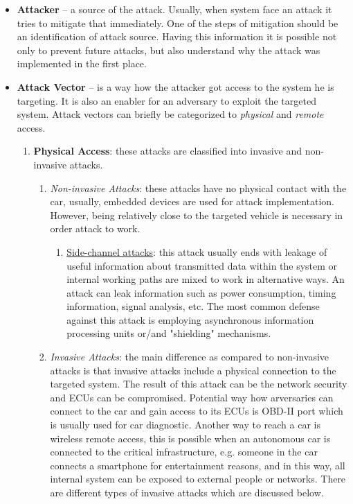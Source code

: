 \begin{itemize}
	\item \textbf{Attacker} -- a source of the attack. Usually, when system face an attack it tries to mitigate that immediately. One of the steps of mitigation should be an identification of attack source. Having this information it is possible not only to prevent future attacks, but also understand why the attack was implemented in the first place.
	\item \textbf{Attack Vector} --  is a way how the attacker got access to the system he is targeting. It is also an enabler for an adversary to exploit the targeted system. Attack vectors can briefly be categorized to \textit{physical} and \textit{remote} access.
	
	\begin{enumerate}
		\item \textbf{Physical Access}: these attacks are classified into invasive and non-invasive attacks.
		\begin{enumerate}
			\item \textit{Non-invasive Attacks}: these attacks have no physical contact with the car, usually, embedded devices are used for attack implementation. However, being relatively close to the targeted vehicle is necessary in order attack to work.
			\begin{enumerate}
				\item \underline{Side-channel attacks}: this attack usually ends with leakage of useful information about transmitted data within the system or internal working paths are mixed to work in alternative ways. An attack can leak information such as power consumption, timing information, signal analysis, etc. The most common defense against this attack is employing asynchronous information processing units or/and "shielding"
				mechanisms.
			\end{enumerate}
			\item \textit{Invasive Attacks}: the main difference as compared to non-invasive attacks is that invasive attacks include a physical connection to the targeted system. The result of this attack can be the network security and \glspl{ECU} can be compromised. Potential way how arversaries can connect to the car and gain access to its \glspl{ECU} is \gls{OBD-II} port which is usually used for car diagnostic. Another way to reach a car is wireless remote access, this is possible when an autonomous car is connected to the critical infrastructure, e.g. someone in the car connects a smartphone for entertainment reasons, and in this way, all internal system can be exposed to external people or networks. There are different types of invasive attacks which are discussed below.

\end{enumerate}
\end{enumerate}
\end{itemize}
